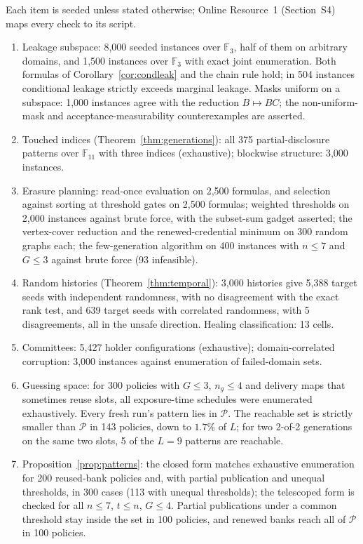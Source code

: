 \documentclass[pdflatex,sn-mathphys-num]{sn-jnl}%
\theoremstyle{plain}
\theoremstyle{definition}
\newcommand{\F}{\mathbb{F}}
\begin{document}
Each item is seeded unless stated otherwise; Online Resource~1 (Section~S4) maps every check to its script.
\begin{enumerate}
\item Leakage subspace: 8,000 seeded instances over $\F_3$, half of them on arbitrary domains, and 1,500 instances over $\F_3$ with exact joint enumeration. Both formulas of Corollary~\ref{cor:condleak} and the chain rule hold; in 504 instances conditional leakage strictly exceeds marginal leakage. Masks uniform on a subspace: 1,000 instances agree with the reduction $B\mapsto BC$; the non-uniform-mask and acceptance-measurability counterexamples are asserted.
\item Touched indices (Theorem~\ref{thm:generations}): all 375 partial-disclosure patterns over $\F_{11}$ with three indices (exhaustive); blockwise structure: 3,000 instances.
\item Erasure planning: read-once evaluation on 2,500 formulas, and selection against sorting at threshold gates on 2,500 formulas; weighted thresholds on 2,000 instances against brute force, with the subset-sum gadget asserted; the vertex-cover reduction and the renewed-credential minimum on 300 random graphs each; the few-generation algorithm on 400 instances with $n\le7$ and $G\le3$ against brute force (93 infeasible).
\item Random histories (Theorem~\ref{thm:temporal}): 3,000 histories give 5,388 target seeds with independent randomness, with no disagreement with the exact rank test, and 639 target seeds with correlated randomness, with 5 disagreements, all in the unsafe direction. Healing classification: 13 cells.
\item Committees: 5,427 holder configurations (exhaustive); domain-correlated corruption: 3,000 instances against enumeration of failed-domain sets.
\item Guessing space: for 300 policies with $G\le3$, $n_g\le4$ and delivery maps that sometimes reuse slots, all exposure-time schedules were enumerated exhaustively. Every fresh run's pattern lies in $\mathcal P$. The reachable set is strictly smaller than $\mathcal P$ in 143 policies, down to $1.7\%$ of $L$; for two 2-of-2 generations on the same two slots, 5 of the $L=9$ patterns are reachable.
\item Proposition~\ref{prop:patterns}: the closed form matches exhaustive enumeration for 200 reused-bank policies and, with partial publication and unequal thresholds, in 300 cases (113 with unequal thresholds); the telescoped form is checked for all $n\le7$, $t\le n$, $G\le4$. Partial publications under a common threshold stay inside the set in 100 policies, and renewed banks reach all of $\mathcal P$ in 100 policies.

\end{enumerate}
\end{document}
